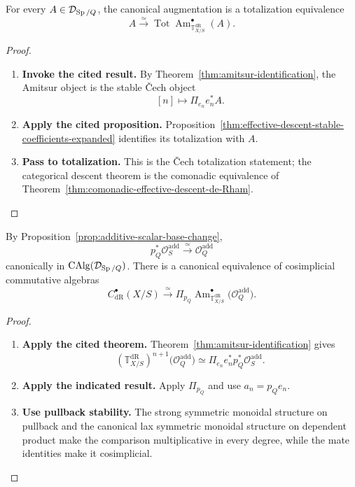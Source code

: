 \begin{corollary}
\label{cor:cech-amitsur-totalization}
For every \(A\in\mathcal D_{\operatorname{Sp}/Q}\), the canonical augmentation is a totalization
equivalence
\[
  A
  \xrightarrow{\simeq}
  \operatorname*{Tot}
  \operatorname{Am}^\bullet_{\mathbb T^{\mathrm{dR}}_{X/S}}(A).
\]
\end{corollary}

\begin{proof}
\leavevmode
\begin{enumerate}[label=\textup{(\arabic*)}]
    \item \textbf{Invoke the cited result.}
    By Theorem~\ref{thm:amitsur-identification}, the Amitsur object is the stable
    \v{C}ech object
    \[
    [n]\longmapsto\Pi_{e_n}e_n^*A.
    \]
    \item \textbf{Apply the cited proposition.}
    Proposition~\ref{thm:effective-descent-stable-coefficients-expanded} identifies
    its totalization with \(A\).
    \item \textbf{Pass to totalization.}
    This is the \v{C}ech totalization statement; the
    categorical descent theorem is the comonadic equivalence of
    Theorem~\ref{thm:comonadic-effective-descent-de-Rham}.
\end{enumerate}
\end{proof}

\begin{theorem}
\label{thm:amitsur-presentation-geometric-cochains}
By Proposition~\ref{prop:additive-scalar-base-change},
\[
  p_Q^*\mathcal O_S^{\mathrm{add}}
  \xrightarrow{\simeq}
  \mathcal O_Q^{\mathrm{add}}
\]
canonically in \(\operatorname{CAlg}(\mathcal D_{\operatorname{Sp}/Q})\). There is a canonical equivalence of
cosimplicial commutative algebras
\[
  C^\bullet_{\mathrm{dR}}(X/S)
  \xrightarrow{\simeq}
  \Pi_{p_Q}
  \operatorname{Am}^\bullet_{\mathbb T^{\mathrm{dR}}_{X/S}}
  \bigl(\mathcal O_Q^{\mathrm{add}}\bigr).
\]
\end{theorem}

\begin{proof}
\leavevmode
\begin{enumerate}[label=\textup{(\arabic*)}]
    \item \textbf{Apply the cited theorem.}
    Theorem~\ref{thm:amitsur-identification} gives
    \[
    (\mathbb T^{\mathrm{dR}}_{X/S})^{n+1}
    \bigl(\mathcal O_Q^{\mathrm{add}}\bigr)
    \simeq
    \Pi_{e_n}e_n^*p_Q^*\mathcal O_S^{\mathrm{add}}.
    \]
    \item \textbf{Apply the indicated result.}
    Apply \(\Pi_{p_Q}\) and use \(a_n=p_Qe_n\).
    \item \textbf{Use pullback stability.}
    The strong symmetric monoidal
    structure on pullback and the canonical lax symmetric monoidal structure on
    dependent product make the comparison multiplicative in every degree, while the
    mate identities make it cosimplicial.
\end{enumerate}
\end{proof}

